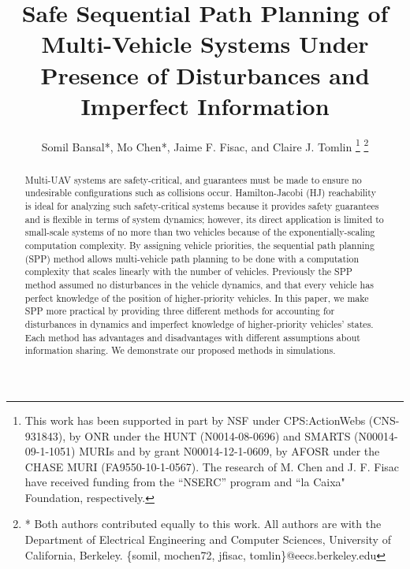 \documentclass[letterpaper, 10 pt, conference]{ieeeconf}
\title{\LARGE \bf
Safe Sequential Path Planning of Multi-Vehicle Systems Under Presence of Disturbances and Imperfect Information}
\author{Somil Bansal*, Mo Chen*, Jaime F. Fisac, and Claire J. Tomlin
\thanks{This work has been supported in part by NSF under CPS:ActionWebs (CNS-931843), by ONR under the HUNT (N0014-08-0696) and SMARTS (N00014-09-1-1051) MURIs and by grant N00014-12-1-0609, by AFOSR under the CHASE MURI (FA9550-10-1-0567). The research of M. Chen and J. F. Fisac have received funding from the ``NSERC'' program and ``la Caixa" Foundation, respectively.}
\thanks{* Both authors contributed equally to this work. All authors are with the Department of Electrical Engineering and Computer Sciences, University of California, Berkeley. \{somil, mochen72, jfisac, tomlin\}@eecs.berkeley.edu}
}
\begin{document}
\maketitle
\thispagestyle{empty}
\pagestyle{empty}

\begin{abstract}
Multi-UAV systems are safety-critical, and guarantees must be made to ensure no undesirable configurations such as collisions occur. Hamilton-Jacobi (HJ) reachability is ideal for analyzing such safety-critical systems because it provides safety guarantees and is flexible in terms of system dynamics; however, its direct application is limited to small-scale systems of no more than two vehicles because of the exponentially-scaling computation complexity. By assigning vehicle priorities, the sequential path planning (SPP) method allows multi-vehicle path planning to be done with a computation complexity that scales linearly with the number of vehicles. Previously the SPP method assumed no disturbances in the vehicle dynamics, and that every vehicle has perfect knowledge of the position of higher-priority vehicles. In this paper, we make SPP more practical by providing three different methods for accounting for disturbances in dynamics and imperfect knowledge of higher-priority vehicles' states. Each method has advantages and disadvantages with different assumptions about information sharing. We demonstrate our proposed methods in simulations.
\end{abstract}












\end{document}
